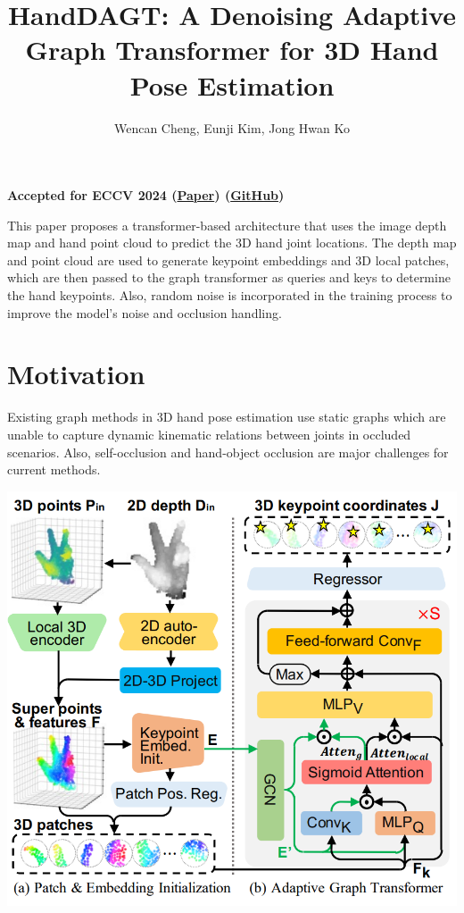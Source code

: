 \documentclass{article}
\title{HandDAGT: A Denoising Adaptive Graph Transformer for 3D Hand Pose Estimation}
\author{Wencan Cheng, Eunji Kim, Jong Hwan Ko}
\date{}
\begin{document}
\maketitle

\begin{center}\textbf{Accepted for ECCV 2024 (\href{https://arxiv.org/pdf/2407.20542}{Paper}) (\href{https://github.com/cwc1260/HandDAGT}{GitHub})}\end{center}

This paper proposes a transformer-based architecture that uses the image depth map and hand point cloud to predict the 3D hand joint locations. The depth map and point cloud are used to generate keypoint embeddings and 3D local patches, which are then passed to the graph transformer as queries and keys to determine the hand keypoints. Also, random noise is incorporated in the training process to improve the model's noise and occlusion handling.

\section*{Motivation}

Existing graph methods in 3D hand pose estimation use static graphs which are unable to capture dynamic kinematic relations between joints in occluded scenarios. Also, self-occlusion and hand-object occlusion are major challenges for current methods.

\begin{center}
    \includegraphics[scale=0.4]{handdagt-1.png}
\end{center}
\end{document}
